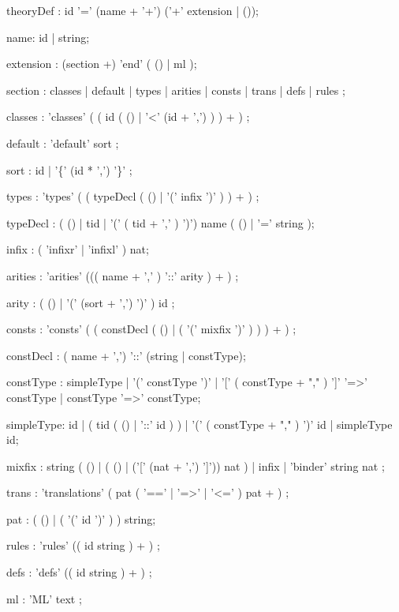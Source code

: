 \begin{rail}

theoryDef : id '=' (name + '+') ('+' extension | ());

name: id | string;

extension : (section +) 'end' ( () | ml );

section : classes
        | default
        | types
        | arities
        | consts
        | trans
        | defs
        | rules
        ;

classes : 'classes' ( ( id (  ()
                            | '<' (id + ',')
                           ) 
                       ) + )
        ;

default : 'default' sort 
        ;

sort :  id
     | '\{' (id * ',') '\}'
     ;

types : 'types' ( ( typeDecl ( () | '(' infix ')' ) ) + )
      ;

typeDecl : ( () | tid | '(' ( tid + ',' ) ')') name ( () | '='  string );

infix : ( 'infixr' | 'infixl' ) nat;


arities : 'arities' ((( name + ',' ) '::' arity ) + )
        ;

arity   : ( () 
          | '(' (sort + ',') ')' 
          ) id
        ;


consts : 'consts' ( ( constDecl ( () | ( '(' mixfix ')' ) ) ) + )
       ;

constDecl : ( name + ',') '::' (string | constType);

constType : simpleType | '(' constType ')' | '[' ( constType + "," ) ']'
            '=>' constType | constType '=>' constType;

simpleType: id | ( tid ( () | '::' id ) ) |
            '(' ( constType + "," ) ')' id | simpleType id;

mixfix :  string ( () | ( () | ('[' (nat + ',') ']')) nat )
       | infix
       | 'binder' string nat ;

trans : 'translations' ( pat ( '==' | '=>' | '<=' ) pat + )
      ;

pat : ( () | ( '(' id ')' ) ) string;

rules : 'rules' (( id string ) + )
      ;

defs : 'defs' (( id string ) + )
     ;

ml : 'ML' text
   ;

\end{rail}
